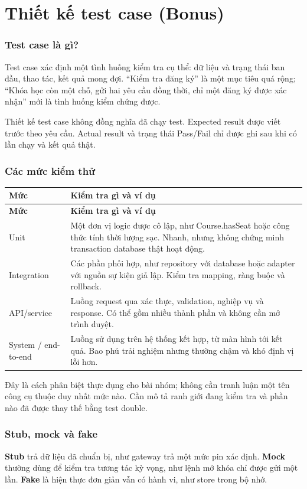 \chapter{Thiết kế test case (Bonus)}
\subsection{Test case là gì?}
Test case xác định một tình huống kiểm tra cụ thể: dữ liệu và trạng thái ban đầu, thao tác, kết quả mong đợi. ``Kiểm tra đăng ký'' là một mục tiêu quá rộng; ``Khóa học còn một chỗ, gửi hai yêu cầu đồng thời, chỉ một đăng ký được xác nhận'' mới là tình huống kiểm chứng được.

Thiết kế test case không đồng nghĩa đã chạy test. Expected result được viết trước theo yêu cầu. Actual result và trạng thái Pass/Fail chỉ được ghi sau khi có lần chạy và kết quả thật.

\subsection{Các mức kiểm thử}
\begin{longtable}{|L{26mm}|L{116mm}|}\hline
\textbf{Mức} & \textbf{Kiểm tra gì và ví dụ}\\\hline
\endfirsthead
\hline
\textbf{Mức} & \textbf{Kiểm tra gì và ví dụ}\\\hline
\endhead
Unit & Một đơn vị logic được cô lập, như Course.hasSeat hoặc công thức tính thời lượng sạc. Nhanh, nhưng không chứng minh transaction database thật hoạt động.\\\hline
Integration & Các phần phối hợp, như repository với database hoặc adapter với nguồn sự kiện giả lập. Kiểm tra mapping, ràng buộc và rollback.\\\hline
API/service & Luồng request qua xác thực, validation, nghiệp vụ và response. Có thể gồm nhiều thành phần và không cần mở trình duyệt.\\\hline
System / end-to-end & Luồng sử dụng trên hệ thống kết hợp, từ màn hình tới kết quả. Bao phủ trải nghiệm nhưng thường chậm và khó định vị lỗi hơn.\\\hline
\end{longtable}
Đây là cách phân biệt thực dụng cho bài nhóm; không cần tranh luận một tên công cụ thuộc duy nhất mức nào. Cần mô tả ranh giới đang kiểm tra và phần nào đã được thay thế bằng test double.

\subsection{Stub, mock và fake}
\textbf{Stub} trả dữ liệu đã chuẩn bị, như gateway trả một mức pin xác định. \textbf{Mock} thường dùng để kiểm tra tương tác kỳ vọng, như lệnh mở khóa chỉ được gửi một lần. \textbf{Fake} là hiện thực đơn giản vẫn có hành vi, như store trong bộ nhớ.

